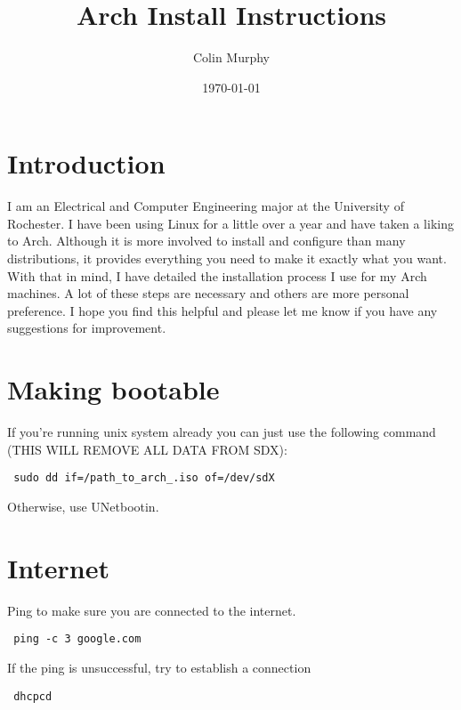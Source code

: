 \documentclass[12pt]{article}
\title{\textbf{Arch Install Instructions}}
\date{\today}
\author{Colin Murphy}
\begin{document}
\clearpage\maketitle
\maketitle

\section*{Introduction}
    I am an Electrical and Computer Engineering major at the University of
    Rochester. I have been using Linux for a little over a year and have taken
    a liking to Arch. Although it is more involved to install and configure
    than many distributions, it provides everything you need to make it exactly
    what you want. With that in mind, I have detailed the installation process
    I use for my Arch machines. A lot of these steps are necessary and others
    are more personal preference. I hope you find this helpful and please let
    me know if you have any suggestions for improvement.

\section*{Making bootable}
    If you're running unix system already you can just use the following command
    (THIS WILL REMOVE ALL DATA FROM SDX):
    \begin{verbatim} sudo dd if=/path_to_arch_.iso of=/dev/sdX \end{verbatim}
    Otherwise, use UNetbootin.

\section*{Internet}
    Ping to make sure you are connected to the internet.
    \begin{verbatim} ping -c 3 google.com \end{verbatim}
    If the ping is unsuccessful, try to establish a connection
    \begin{verbatim} dhcpcd \end{verbatim}
\end{document}
